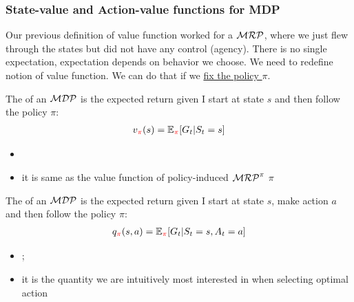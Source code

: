 
\subsubsection{State-value and Action-value functions for MDP}
Our previous definition of value function worked for a $\mathcal{MRP}$, where we just flew through the states but did not have any control (agency). There is no single expectation, expectation depends on behavior we choose. We need to redefine notion of value function. We can do that if we \underline{fix the policy $\pi$}.

The  of an $\mathcal{MDP}$ is the expected return given I start at state $s$ and then follow the policy $\pi$:
\begin{align}
	v_{\textcolor{red}{\pi}}(s) = \operatorname{\mathbb{E}}_{\textcolor{red}{\pi}}[G_t | S_t = s]
\end{align}
\begin{itemize}
	\item {}
	\item it is same as the value function of policy-induced $\mathcal{MRP}^{\pi}$
$\pi$
\end{itemize}

The  of an $\mathcal{MDP}$ is the expected return given I start at state $s$, make action $a$ and then follow the policy $\pi$:
\begin{align}
	q_{\textcolor{red}{\pi}}(s, a) = \operatorname{\mathbb{E}}_{\textcolor{red}{\pi}}[G_t | S_t = s, A_t=a]
\end{align}
\begin{itemize}
	\item {};
	\item it is the quantity we are intuitively most interested in when selecting optimal action

\end{itemize}

